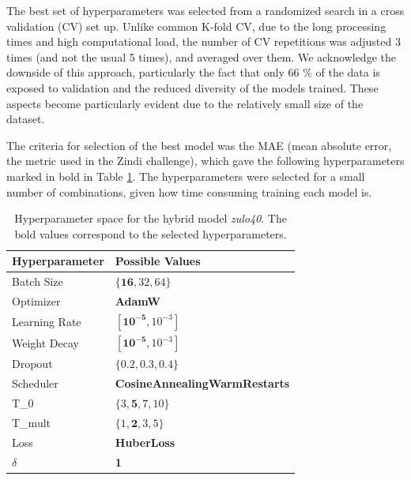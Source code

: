 \documentclass[conference]{IEEEtran}
\begin{document}
The best set of hyperparameters was selected from a randomized search in a cross validation (CV) set up. Unlike common K-fold CV, due to the long processing times and high computational load, the number of CV repetitions was adjusted 3 times (and not the usual 5 times), and averaged over them. We acknowledge the downside of this approach, particularly the fact that only 66 \% of the data is exposed to validation and the reduced diversity of the models trained. These aspects become particularly evident due to the relatively small size of the dataset.

The criteria for selection of the best model was the MAE (mean absolute error, the metric used in the Zindi challenge), which gave the following hyperparameters marked in bold in Table \ref{parametroszulp}. The hyperparameters were selected for a small number of combinations, given how time consuming training each model is.


\begin{table}[H]
\centering
\caption{Hyperparameter space for the hybrid model \textit{zulo40}. The bold values correspond to the selected hyperparameters.}
\label{parametroszulp}
\begin{tabular}{ll}
\toprule
\textbf{Hyperparameter} & \textbf{Possible Values} \\
\midrule
Batch Size & $\{\mathbf{16}, 32, 64\}$ \\
Optimizer & \textbf{AdamW} \\
Learning Rate & $[\mathbf{10^{-5}}, 10^{-3}]$ \\
Weight Decay & $[\mathbf{10^{-5}}, 10^{-3}]$ \\
Dropout & $\{0.2, 0.3, \mathbf{0.4}\}$ \\
Scheduler & \textbf{CosineAnnealingWarmRestarts} \\
T\_0 & $\{3, \mathbf{5}, 7, 10\}$ \\
T\_mult & $\{1, \mathbf{2}, 3, 5\}$ \\
Loss & \textbf{HuberLoss} \\
$\delta$ & \textbf{1} \\
\bottomrule
\end{tabular}
\end{table}
\end{document}
